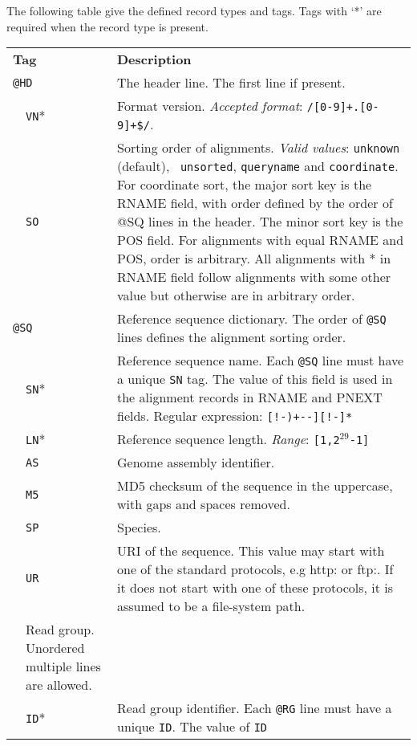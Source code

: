 \documentclass[10pt]{article}
\begin{document}
The following table give the defined record types and tags. Tags with
`*' are required when the record type is present.
\begin{center}
\small
\begin{longtable}{|l|l|p{13.5cm}|}
  \cline{1-3}
  \multicolumn{2}{|l|}{\bf Tag} & {\bf Description} \\
  \cline{1-3}
  \multicolumn{2}{|l}{\tt @HD} & The header line. The first line if present. \\\cline{2-3}
  & {\tt VN}* & Format version. \emph{Accepted format}: {\tt /\char94[0-9]+\char92.[0-9]+\$/}.\\\cline{2-3}
  & {\tt SO} & Sorting order of alignments. \emph{Valid values}: {\tt unknown} (default), {\tt
    unsorted}, {\tt queryname} and {\tt coordinate}. For coordinate sort, the major sort
  key is the RNAME field, with order defined by the order of @SQ lines in the header.  The
  minor sort key is the POS field.  For alignments with equal RNAME and POS, order is
  arbitrary.  All alignments with * in RNAME field follow alignments with some other
  value but otherwise are in arbitrary order.\\\cline{1-3}
  \multicolumn{2}{|l}{\tt @SQ} & Reference sequence dictionary. The order of {\tt @SQ} lines defines the alignment sorting order.\\\cline{2-3}
  & {\tt SN}* & Reference sequence name. Each {\tt @SQ} line must have a unique {\tt SN} tag. The value of this
  field is used in the
  alignment records in RNAME and PNEXT fields. Regular expression: {\tt [!-)+-\char60\char62-\char126][!-\char126]*}\\\cline{2-3}
  & {\tt LN}* & Reference sequence length. \emph{Range}: {\tt [1,2$^{29}$-1]}\\\cline{2-3}
  & {\tt AS} & Genome assembly identifier. \\\cline{2-3}
  & {\tt M5} & MD5 checksum of the sequence in the uppercase, with gaps and spaces removed.\\\cline{2-3}
  & {\tt SP} & Species.\\\cline{2-3}
  & {\tt UR} & URI of the sequence.  This value may start with one of the standard
  protocols, e.g http: or ftp:.  If it does not start with one of these protocols, it is assumed to be a file-system path.\\\cline{1-3}\pagebreak\cline{1-3}
  \multicolumn{2}{|l}{\tt @RG} & Read group. Unordered multiple lines are allowed.\\\cline{2-3}
  & {\tt ID}* & Read group identifier. Each {\tt @RG} line must have a unique {\tt ID}. The value of {\tt ID}

\end{longtable}
\end{center}
\end{document}
